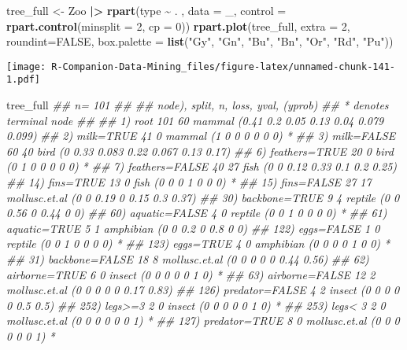 \documentclass[
  notitlepage]{book}
\newenvironment{Shaded}{\begin{snugshade}}{\end{snugshade}}
\newcommand{\CommentTok}[1]{\textcolor[rgb]{0.56,0.35,0.01}{\textit{#1}}}
\newcommand{\DataTypeTok}[1]{\textcolor[rgb]{0.13,0.29,0.53}{#1}}
\newcommand{\DecValTok}[1]{\textcolor[rgb]{0.00,0.00,0.81}{#1}}
\newcommand{\ErrorTok}[1]{\textcolor[rgb]{0.64,0.00,0.00}{\textbf{#1}}}
\newcommand{\KeywordTok}[1]{\textcolor[rgb]{0.13,0.29,0.53}{\textbf{#1}}}
\newcommand{\NormalTok}[1]{#1}
\newcommand{\OperatorTok}[1]{\textcolor[rgb]{0.81,0.36,0.00}{\textbf{#1}}}
\newcommand{\OtherTok}[1]{\textcolor[rgb]{0.56,0.35,0.01}{#1}}
\newcommand{\StringTok}[1]{\textcolor[rgb]{0.31,0.60,0.02}{#1}}
\begin{document}
\begin{Shaded}
\begin{Highlighting}[]
\NormalTok{tree\_full \textless{}{-}}\StringTok{ }\NormalTok{Zoo }\OperatorTok{|}\ErrorTok{\textgreater{}}\StringTok{ }
\StringTok{  }\KeywordTok{rpart}\NormalTok{(type }\OperatorTok{\textasciitilde{}}\StringTok{ }\NormalTok{. , }\DataTypeTok{data =}\NormalTok{ \_, }
        \DataTypeTok{control =} \KeywordTok{rpart.control}\NormalTok{(}\DataTypeTok{minsplit =} \DecValTok{2}\NormalTok{, }\DataTypeTok{cp =} \DecValTok{0}\NormalTok{))}
\KeywordTok{rpart.plot}\NormalTok{(tree\_full, }\DataTypeTok{extra =} \DecValTok{2}\NormalTok{, }
           \DataTypeTok{roundint=}\OtherTok{FALSE}\NormalTok{,}
           \DataTypeTok{box.palette =} \KeywordTok{list}\NormalTok{(}\StringTok{"Gy"}\NormalTok{, }\StringTok{"Gn"}\NormalTok{, }\StringTok{"Bu"}\NormalTok{, }\StringTok{"Bn"}\NormalTok{, }
                              \StringTok{"Or"}\NormalTok{, }\StringTok{"Rd"}\NormalTok{, }\StringTok{"Pu"}\NormalTok{)) }
\end{Highlighting}
\end{Shaded}

\texttt{[image: R-Companion-Data-Mining\_files/figure-latex/unnamed-chunk-141-1.pdf]}

\begin{Shaded}
\begin{Highlighting}[]
\NormalTok{tree\_full}
\CommentTok{\#\# n= 101 }
\CommentTok{\#\# }
\CommentTok{\#\# node), split, n, loss, yval, (yprob)}
\CommentTok{\#\#       * denotes terminal node}
\CommentTok{\#\# }
\CommentTok{\#\#   1) root 101 60 mammal (0.41 0.2 0.05 0.13 0.04 0.079 0.099)  }
\CommentTok{\#\#     2) milk=TRUE 41  0 mammal (1 0 0 0 0 0 0) *}
\CommentTok{\#\#     3) milk=FALSE 60 40 bird (0 0.33 0.083 0.22 0.067 0.13 0.17)  }
\CommentTok{\#\#       6) feathers=TRUE 20  0 bird (0 1 0 0 0 0 0) *}
\CommentTok{\#\#       7) feathers=FALSE 40 27 fish (0 0 0.12 0.33 0.1 0.2 0.25)  }
\CommentTok{\#\#        14) fins=TRUE 13  0 fish (0 0 0 1 0 0 0) *}
\CommentTok{\#\#        15) fins=FALSE 27 17 mollusc.et.al (0 0 0.19 0 0.15 0.3 0.37)  }
\CommentTok{\#\#          30) backbone=TRUE 9  4 reptile (0 0 0.56 0 0.44 0 0)  }
\CommentTok{\#\#            60) aquatic=FALSE 4  0 reptile (0 0 1 0 0 0 0) *}
\CommentTok{\#\#            61) aquatic=TRUE 5  1 amphibian (0 0 0.2 0 0.8 0 0)  }
\CommentTok{\#\#             122) eggs=FALSE 1  0 reptile (0 0 1 0 0 0 0) *}
\CommentTok{\#\#             123) eggs=TRUE 4  0 amphibian (0 0 0 0 1 0 0) *}
\CommentTok{\#\#          31) backbone=FALSE 18  8 mollusc.et.al (0 0 0 0 0 0.44 0.56)  }
\CommentTok{\#\#            62) airborne=TRUE 6  0 insect (0 0 0 0 0 1 0) *}
\CommentTok{\#\#            63) airborne=FALSE 12  2 mollusc.et.al (0 0 0 0 0 0.17 0.83)  }
\CommentTok{\#\#             126) predator=FALSE 4  2 insect (0 0 0 0 0 0.5 0.5)  }
\CommentTok{\#\#               252) legs\textgreater{}=3 2  0 insect (0 0 0 0 0 1 0) *}
\CommentTok{\#\#               253) legs\textless{} 3 2  0 mollusc.et.al (0 0 0 0 0 0 1) *}
\CommentTok{\#\#             127) predator=TRUE 8  0 mollusc.et.al (0 0 0 0 0 0 1) *}
\end{Highlighting}
\end{Shaded}
\end{document}
